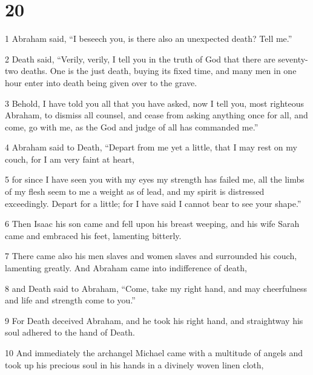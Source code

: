 \chapter{20}

\par 1 Abraham said, “I beseech you, is there also an unexpected death? Tell me.” 

\par 2 Death said, “Verily, verily, I tell you in the truth of God that there are seventy-two deaths. One is the just death, buying its fixed time, and many men in one hour enter into death being given over to the grave. 

\par 3 Behold, I have told you all that you have asked, now I tell you, most righteous Abraham, to dismiss all counsel, and cease from asking anything once for all, and come, go with me, as the God and judge of all has commanded me.” 

\par 4 Abraham said to Death, “Depart from me yet a little, that I may rest on my couch, for I am very faint at heart, 

\par 5 for since I have seen you with my eyes my strength has failed me, all the limbs of my flesh seem to me a weight as of lead, and my spirit is distressed exceedingly. Depart for a little; for I have said I cannot bear to see your shape.” 

\par 6 Then Isaac his son came and fell upon his breast weeping, and his wife Sarah came and embraced his feet, lamenting bitterly. 

\par 7 There came also his men slaves and women slaves and surrounded his couch, lamenting greatly. And Abraham came into indifference of death, 

\par 8 and Death said to Abraham, “Come, take my right hand, and may cheerfulness and life and strength come to you.” 

\par 9 For Death deceived Abraham, and he took his right hand, and straightway his soul adhered to the hand of Death. 

\par 10 And immediately the archangel Michael came with a multitude of angels and took up his precious soul in his hands in a divinely woven linen cloth, 

